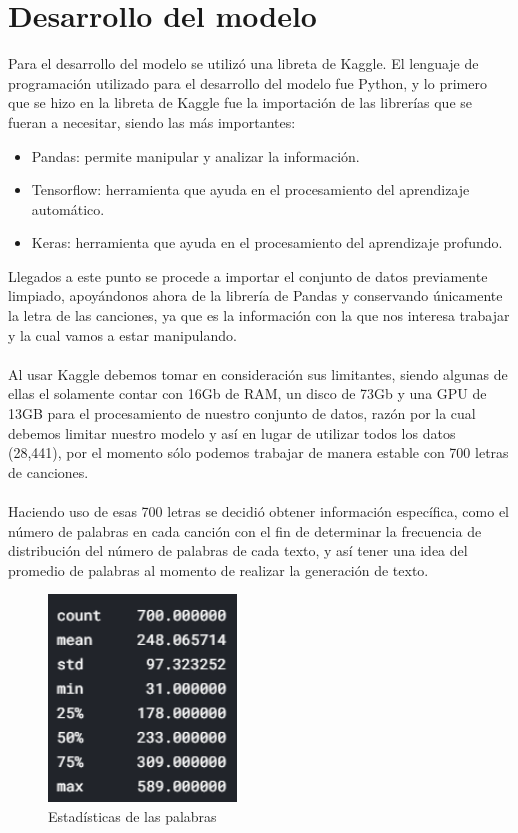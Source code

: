\documentclass[12pt, a4paper, titlepage]{article}
\begin{document}
	\section{Desarrollo del modelo}
	Para el desarrollo del modelo se utilizó una libreta de Kaggle. El lenguaje de programación utilizado para el desarrollo del modelo fue Python, y lo primero que se hizo en la libreta de Kaggle fue la importación de las librerías que se fueran a necesitar, siendo las más importantes:	
	\begin{itemize}
		\item Pandas: permite manipular y analizar la información.
		\item Tensorflow: herramienta que ayuda en el procesamiento del aprendizaje automático.
		\item Keras: herramienta que ayuda en el procesamiento del aprendizaje profundo.
	\end{itemize}
	Llegados a este punto se procede a importar el conjunto de datos previamente limpiado, apoyándonos ahora de la librería de Pandas y conservando únicamente la letra de las canciones, ya que es la información con la que nos interesa trabajar y la cual vamos a estar manipulando.\\\\
	Al usar Kaggle debemos tomar en consideración sus limitantes, siendo algunas de ellas el solamente contar con 16Gb de RAM, un disco de 73Gb y una GPU de 13GB para el procesamiento de nuestro conjunto de datos, razón por la cual debemos limitar nuestro modelo y así en lugar de utilizar todos los datos (28,441), por el momento sólo podemos trabajar de manera estable con 700 letras de canciones.\\\\
	Haciendo uso de esas 700 letras se decidió obtener información específica, como el número de palabras en cada canción con el fin de determinar la frecuencia de distribución del número de palabras de cada texto, y así tener una idea del promedio de palabras al momento de realizar la generación de texto.
	\begin{figure}[H]
		\includegraphics[width=5cm]{./Imagenes/Modelo/estadistica.png}
		\centering 
		\caption{Estadísticas de las palabras}
	\end{figure}
\end{document}
